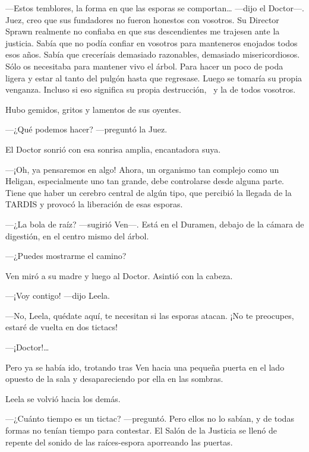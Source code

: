 ---Estos temblores, la forma en que las esporas se comportan\ldots{}
---dijo el Doctor---. Juez, creo que sus fundadores no fueron honestos
con vosotros. Su Director Sprawn realmente no confiaba en que sus
descendientes me trajesen ante la justicia. Sabía que no podía confiar
en vosotros para manteneros enojados todos esos años. Sabía que
creceríais demasiado razonables, demasiado misericordiosos. Sólo os
necesitaba para mantener vivo el árbol. Para hacer un poco de poda
ligera y estar al tanto del pulgón hasta que regresase. Luego se tomaría
su propia venganza. Incluso si eso significa su propia destrucción, ~y
la de todos vosotros.

Hubo gemidos, gritos y lamentos de sus oyentes.

---¿Qué podemos hacer? ---preguntó la Juez.

El Doctor sonrió con esa sonrisa amplia, encantadora suya.

---¡Oh, ya pensaremos en algo! Ahora, un organismo tan complejo como un
Heligan, especialmente uno tan grande, debe controlarse desde alguna
parte. Tiene que haber un cerebro central de algún tipo, que percibió la
llegada de la TARDIS y provocó la liberación de esas esporas.

---¿La bola de raíz? ---sugirió Ven---. Está en el Duramen, debajo de la
cámara de digestión, en el centro mismo del árbol.

---¿Puedes mostrarme el camino?

Ven miró a su madre y luego al Doctor. Asintió con la cabeza.

---¡Voy contigo! ---dijo Leela.

---No, Leela, quédate aquí, te necesitan si las esporas atacan. ¡No te
preocupes, estaré de vuelta en dos tictacs!

---¡Doctor!\ldots{}

Pero ya se había ido, trotando tras Ven hacia una pequeña puerta en el
lado opuesto de la sala y desapareciendo por ella en las sombras.

Leela se volvió hacia los demás.

---¿Cuánto tiempo es un tictac? ---preguntó. Pero ellos no lo sabían, y
de todas formas no tenían tiempo para contestar. El Salón de la Justicia
se llenó de repente del sonido de las raíces-espora aporreando las
puertas.